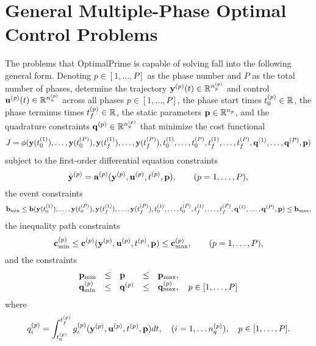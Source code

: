 \documentclass[prodmode,acmtecs]{acmsmall}
\begin{document}
\section{General Multiple-Phase Optimal Control Problems}

The problems that OptimalPrime is capable of solving fall into the
following general form.  Denoting $p\in[1,\ldots,P]$ as the phase
number and $P$ as the total number of phases, determine the trajectory
$\mathbf{y}^{(p)}(t)\in\mathbb{R}^{n_y^{(p)}}$ and control $\mathbf{u}^{(p)}(t)\in\mathbb{R}^{n_u^{(p)}}$
across all phases $p\in[1,\ldots,P]$, the phase start times
$t_0^{(p)}\in\mathbb{R}$, the phase terminus times $t_f^{(p)}\in\mathbb{R}$, the
static parameters $\mathbf{p}\in\mathbb{R}^{n_p}$, and the quadrature constraints
$\mathbf{q}^{(p)}\in\mathbb{R}^{n_q^{(p)}}$ that minimize the cost functional
\begin{equation}\label{general-cost}
  J =
 \phi(\bfy(  t_0^{(1)}),\ldots,\bfy(t_0^{(P)}),\bfy(t_f^{(1)}),\ldots,\bfy(t_f^{(P)}),t_0^{(1)},\ldots,t_0^{(P)},t_f^{(1)},\ldots,t_f^{(P)},
\bfq^{(1)},\ldots,\bfq^{(P)}, \bfp)
\end{equation}
subject to the first-order differential equation constraints
\begin{equation}\label{general-dynamics}
  \dbfy^{(p)} = \bfa^{(p)}(\bfy^{(p)},\bfu^{(p)},t^{(p)},\bfp), \qquad (p=1,\ldots,P),
\end{equation}
the event constraints
\begin{equation}\label{general-event}
\bfb_{\min} \leq \bfb(\bfy(  t_0^{(1)}),\ldots,\bfy(t_0^{(P)}),\bfy(t_f^{(1)}),\ldots,\bfy(t_f^{(P)}),t_0^{(1)},\ldots,t_0^{(P)},t_f^{(1)},\ldots,t_f^{(P)},
\bfq^{(1)},\ldots,\bfq^{(P)}, \bfp)\leq \bfb_{\max}, 
\end{equation} 
the inequality path constraints
\begin{equation}\label{general-path}
  \bfc_{\min}^{(p)} \leq \bfc^{(p)}(\bfy^{(p)},\bfu^{(p)},t^{(p)},\bfp)\leq  \bfc_{\max}^{(p)}, \qquad  (p=1,\ldots,P),
\end{equation}
and the constraints
\begin{equation}
  \begin{array}{lclcl}
    \mathbf{p}_{\min} & \leq & \mathbf{p} & \leq & \mathbf{p}_{\max}, \\
    \mathbf{q}_{\min}^{(p)} & \leq & \mathbf{q} ^{(p)} & \leq & \mathbf{q}_{\max}^{(p)},  \quad p\in[1,\ldots,P]\\
 \end{array}
\end{equation}
where
\begin{equation}
  q_i^{(p)} = \int_{t_0^{(p)}}^{t_f^{(p)}}   g_i^{(p)} (\mathbf{y}^{(p)},\mathbf{u}^{(p)},t^{(p)},\mathbf{p})dt, \quad (i=1,\ldots n_q^{(p)}),  \quad p\in[1,\ldots,P].
\end{equation}
\end{document}
